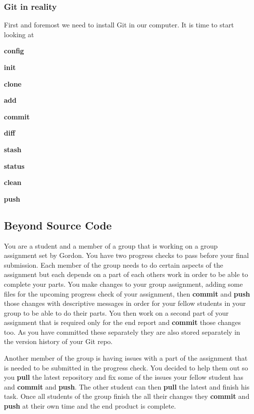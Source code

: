 \documentclass[
]{book}
\begin{document}
\hypertarget{git-in-reality}{%
\subsubsection{Git in reality}\label{git-in-reality}}

First and foremost we need to install Git in our computer.
It is time to start looking at

\textbf{config}

\textbf{init}

\textbf{clone}

\textbf{add}

\textbf{commit}

\textbf{diff}

\textbf{stash}

\textbf{status}

\textbf{clean}

\textbf{push}

\hypertarget{beyond-source-code}{%
\subsection{Beyond Source Code}\label{beyond-source-code}}

You are a student and a member of a group that is working on a group assignment set by Gordon. You have two progress checks to pass before your final submission.
Each member of the group needs to do certain aspects of the assignment but each depends on a part of each others work in order to be able to complete your parts.
You make changes to your group assignment, adding some files for the upcoming progress check of your assignment, then \textbf{commit} and \textbf{push} those changes with descriptive messages in order for your fellow students in your group to be able to do their parts. You then work on a second part of your assignment that is required only for the end report and \textbf{commit} those changes too. As you have committed these separately they are also stored separately in the version history of your Git repo.

Another member of the group is having issues with a part of the assignment that is needed to be submitted in the progress check. You decided to help them out so you \textbf{pull} the latest repository and fix some of the issues your fellow student has and \textbf{commit} and \textbf{push}. The other student can then \textbf{pull} the latest and finish his task. Once all students of the group finish the
all their changes they \textbf{commit} and \textbf{push} at their own time and the end product is complete.
\end{document}
